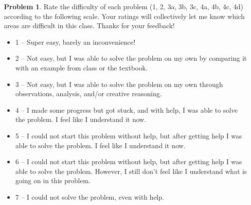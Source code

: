 \documentclass[11pt,oneside]{amsart}
\theoremstyle{definition}
\newtheorem{problem}{Problem}
\theoremstyle{plain}
\begin{document}
    \begin{problem}
        Rate the difficulty of each problem (1, 2, 3a, 3b, 3c, 4a, 4b, 4c, 4d) according to the following scale. Your ratings will collectively let me know which areas are difficult in this class. Thanks for your feedback!
        \begin{itemize}
            \item 1 -- Super easy, barely an inconvenience!
            \item 2 -- Not easy, but I was able to solve the problem on my own by comparing it with an example from class or the textbook.
            \item 3 -- Not easy, but I was able to solve the problem on my own through observations, analysis, and/or creative reasoning.
            \item 4 -- I made some progress but got stuck, and with help, I was able to solve the problem. I feel like I understand it now.
            \item 5 -- I could not start this problem without help, but after getting help I was able to solve the problem. I feel like I understand it now.
            \item 6 -- I could not start this problem without help, but after getting help I was able to solve the problem. However, I still don't feel like I understand what is going on in this problem.
            \item 7 -- I could not solve the problem, even with help.
        \end{itemize}
    \end{problem}
\end{document}
